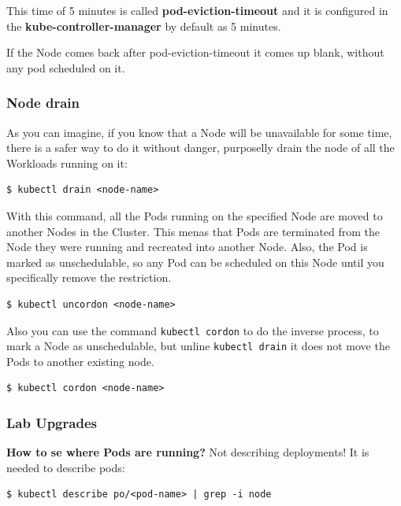 \documentclass{article}
\newenvironment{codetemplate}[1][]{%
  \mybasecolorbox[#1]
  \itshape
}{%
  \endmybasecolorbox
}
\begin{document}
This time of 5 minutes is called \textbf{pod-eviction-timeout} and it is configured in the \textbf{kube-controller-manager} by default as 5 minutes.

If the Node comes back after pod-eviction-timeout it comes up blank, without any pod scheduled on it.

\subsubsection{Node drain}

As you can imagine, if you know that a Node will be unavailable for some time, there is a safer way to do it without danger, purposelly drain the node of all the Workloads running on it:

\begin{codetemplate}{}
\begin{verbatim}
$ kubectl drain <node-name>
\end{verbatim}
\end{codetemplate}

With this command, all the Pods running on the specified Node are moved to another Nodes in the Cluster. This menas that Pods are terminated from the Node they were running and recreated into another Node. Also, the Pod is marked as unschedulable, so any Pod can be scheduled on this Node until you specifically remove the restriction.

\begin{codetemplate}{}
\begin{verbatim}
$ kubectl uncordon <node-name>
\end{verbatim}
\end{codetemplate}

Also you can use the command \verb|kubectl cordon| to do the inverse process, to mark a Node as unschedulable, but unline \verb|kubectl drain| it does not move the Pods to another existing node.

\begin{codetemplate}{}
\begin{verbatim}
$ kubectl cordon <node-name>
\end{verbatim}
\end{codetemplate}

\subsubsection{Lab Upgrades}

\textbf{How to se where Pods are running?}
Not describing deployments! It is needed to describe pods:
\begin{codetemplate}{}
\begin{verbatim}
$ kubectl describe po/<pod-name> | grep -i node
\end{verbatim}
\end{codetemplate}
\end{document}
